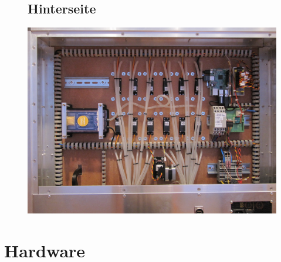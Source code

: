 \documentclass[12pt,letterpaper]{article}
\begin{document}
\begin{figure}
	\subsection{Hinterseite}
	\begin{center}
	\includegraphics[scale=0.5]{"hector9000-hinten.jpeg"}		
	\end{center}
	\end{figure}
	
	
	\newpage
	\section{Hardware}
	
	
	\begin{lstlisting}[language=bash]


	\end{lstlisting}
	
\end{document}
